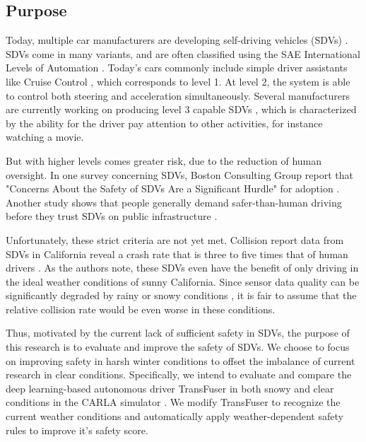 \subsection*{Purpose}
Today, multiple car manufacturers are developing self-driving vehicles (SDVs) \cite{tesla:autopilot}\cite{waymo:home}\cite{honda:autonomous}.
SDVs come in many variants,
and are often classified using the SAE International Levels of Automation \cite{sae:levels}.
Today's cars commonly include simple driver assistants like Cruise Control \cite{wikipedia:acc},
which corresponds to level 1.
At level 2, the system is able to control both steering and acceleration simultaneously.
Several manufacturers are currently working on producing level 3 capable SDVs \cite{honda-level3, mercedes-level3},
which is characterized by the ability for the driver pay attention to other activities,
for instance watching a movie.

But with higher levels comes greater risk,
due to the reduction of human oversight.
In one survey concerning SDVs,
Boston Consulting Group report that "Concerns About the Safety of SDVs Are a Significant Hurdle" for adoption \cite{bcg:survey}.
Another study shows that people generally demand safer-than-human driving
before they trust SDVs on public infrastructure \cite{NEES201961}.

Unfortunately, these strict criteria are not yet met.
Collision report data from SDVs in California reveal a crash rate that is three to five times that of human drivers \cite{10.1115/1.4051779}.
As the authors note, these SDVs even have the benefit of only driving in the ideal weather conditions of sunny California.
Since sensor data quality can be significantly degraded by rainy or snowy conditions \cite{goberville2020analysis},
it is fair to assume that the relative collision rate would be even worse in these conditions.

Thus, motivated by the current lack of sufficient safety in SDVs,
the purpose of this research is to evaluate and improve the safety of SDVs.
We choose to focus on improving safety in harsh winter conditions
to offset the imbalance of current research in clear conditions.
Specifically,
we intend to evaluate and compare the deep learning-based autonomous driver TransFuser \cite{transfuser:pami}
in both snowy and clear conditions in the CARLA simulator \cite{Dosovitskiy17}.
We modify TransFuser to recognize the current weather conditions
and automatically apply weather-dependent safety rules to improve it's safety score.

